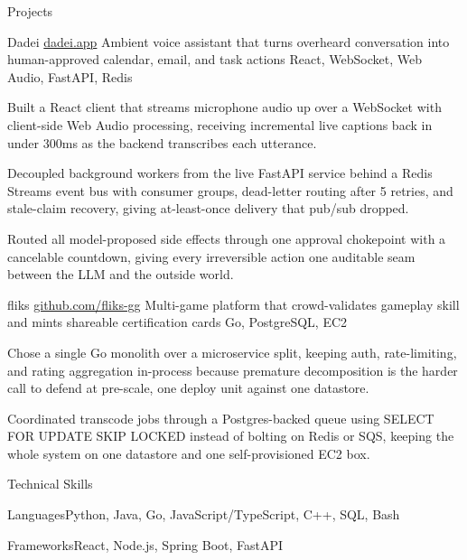 \documentclass[
	11pt
]{../../../template}
\begin{document}
	\begin{rSection}{P}{rojects}
		\begin{rSectionEntry}
			{Dadei}
			{\href{https://dadei.app}{dadei.app}}
			{Ambient voice assistant that turns overheard conversation into human-approved calendar, email, and task actions}
			{React, WebSocket, Web Audio, FastAPI, Redis}
			{}

			\item Built a React client that streams microphone audio up over a WebSocket with client-side Web Audio processing, receiving incremental live captions back in under 300ms as the backend transcribes each utterance.
			\item Decoupled background workers from the live FastAPI service behind a Redis Streams event bus with consumer groups, dead-letter routing after 5 retries, and stale-claim recovery, giving at-least-once delivery that pub/sub dropped.
			\item Routed all model-proposed side effects through one approval chokepoint with a cancelable countdown, giving every irreversible action one auditable seam between the LLM and the outside world.
		\end{rSectionEntry}

		\begin{rSectionEntry}
			{fliks}
			{\href{https://github.com/fliks-gg}{github.com/fliks-gg}}
			{Multi-game platform that crowd-validates gameplay skill and mints shareable certification cards}
			{Go, PostgreSQL, EC2}
			{}

			\item Chose a single Go monolith over a microservice split, keeping auth, rate-limiting, and rating aggregation in-process because premature decomposition is the harder call to defend at pre-scale, one deploy unit against one datastore.
			\item Coordinated transcode jobs through a Postgres-backed queue using SELECT FOR UPDATE SKIP LOCKED instead of bolting on Redis or SQS, keeping the whole system on one datastore and one self-provisioned EC2 box.
		\end{rSectionEntry}
	\end{rSection}

	\begin{rSection}{T}{echnical Skills}
		\begin{rSet}{Languages}{Python, Java, Go, JavaScript/TypeScript, C++, SQL, Bash}
		\end{rSet}
		\begin{rSet}{Frameworks}{React, Node.js, Spring Boot, FastAPI}
		\end{rSet}
	\end{rSection}
\end{document}
